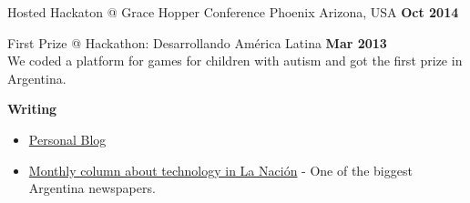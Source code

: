 \documentclass[margin,line]{resume}
\begin{document}
\begin{resume}
\begin{list2}
\item Hosted Hackaton @ Grace Hopper Conference Phoenix Arizona, USA \hfill \textbf{Oct 2014} 

\item First Prize @ Hackathon: Desarrollando Am\'erica Latina \hfill \textbf{Mar 2013} \\
We coded a platform for games for children with autism and got the first prize in Argentina.
\end{list2}

\textbf{Writing}
\begin{itemize}
\item \href{https://medium.com/@carohadad} {Personal Blog}
\item \href{http://www.lanacion.com.ar/autor/carolina-hadad-10522} {Monthly column about technology in La Naci\'on} - One of the biggest Argentina newspapers.
\end{itemize}

    

\end{resume}
\end{document}
